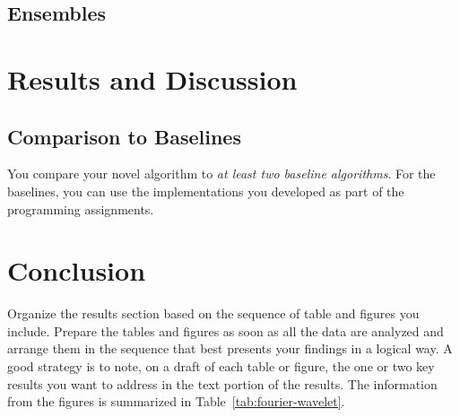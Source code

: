 \documentclass[10pt,conference,compsocconf]{IEEEtran}
\begin{document}
    \subsection{Ensembles}


    \section{Results and Discussion}

    \subsection{Comparison to Baselines}

    You compare your novel algorithm to \emph{at least two baseline
    algorithms}. For the baselines, you can use the implementations you
    developed as part of the programming assignments.


    \section{Conclusion}

    Organize the results section based on the sequence of table and
    figures you include. Prepare the tables and figures as soon as all
    the data are analyzed and arrange them in the sequence that best
    presents your findings in a logical way. A good strategy is to note,
    on a draft of each table or figure, the one or two key results you
    want to address in the text portion of the results.
    The information from the figures is
    summarized in Table~\ref{tab:fourier-wavelet}.




    
    
\end{document}
